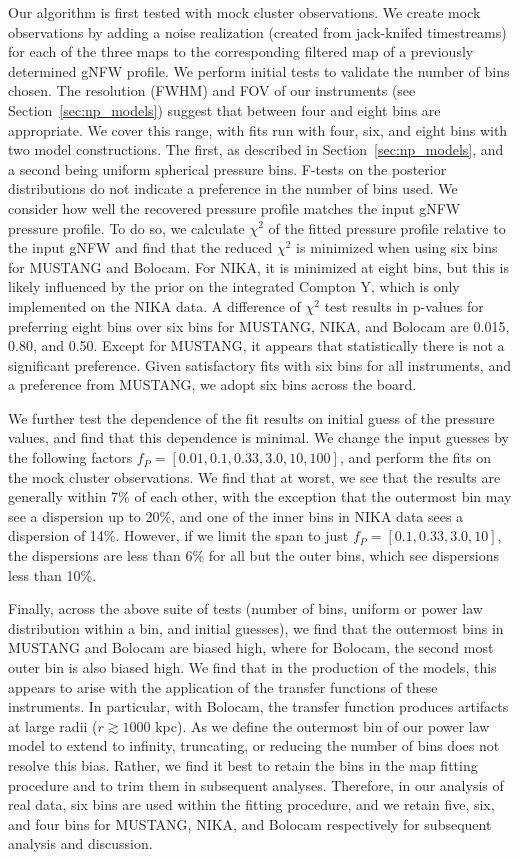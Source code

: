 \documentclass[onecolumn,traditabstract]{aa}
\begin{document}
Our algorithm is first tested with mock cluster observations. We create mock observations by adding
a noise realization (created from jack-knifed timestreams) for each of the three maps to the
corresponding filtered map of a previously determined \citep{romero2017} gNFW profile.
We perform initial tests to validate the number of bins chosen. The resolution (FWHM) and FOV of our
instruments (see Section~\ref{sec:np_models}) suggest that between four and eight bins are appropriate.
We cover this range, with fits run with four, six, and eight bins with two model constructions. The first,
as described in Section~\ref{sec:np_models}, and a second being uniform spherical pressure bins.
F-tests on the posterior distributions do not indicate a preference in the number of bins used.
We consider how well the recovered pressure profile matches the input gNFW pressure profile. To do so,
we calculate $\chi^2$ of the fitted pressure profile relative to the input gNFW and find
that the reduced $\chi^2$ is minimized when using six bins for MUSTANG and Bolocam. For NIKA, it is
minimized at eight bins, but this is likely influenced by the prior on the integrated Compton Y,
which is only implemented on the NIKA data. A difference of $\chi^2$ test results in p-values for
preferring eight bins over six bins for MUSTANG, NIKA, and Bolocam are 0.015, 0.80, and 0.50. Except for
MUSTANG, it appears that statistically there is not a significant preference. Given satisfactory
fits with six bins for all instruments, and a preference from MUSTANG, we adopt six bins across the board.

We further test the dependence of the fit results on initial guess of the pressure values, and find that this
dependence is minimal. We change the input guesses by the
following factors $f_P = [0.01,0.1,0.33,3.0,10,100]$, and perform the fits on the mock cluster observations.
We find that at worst, we see that the results are generally within 7\% of each other, with the exception
that the outermost bin may see a dispersion up to 20\%, and one of the inner bins in NIKA data sees a dispersion
of 14\%. However, if we limit the span to just $f_P = [0.1,0.33,3.0,10]$, the dispersions are less than 6\%
for all but the outer bins, which see dispersions less than 10\%.

Finally, across the above suite of tests (number of bins, uniform or power law distribution within a bin, and
initial guesses), we find that the outermost bins in MUSTANG and Bolocam are biased high, where for Bolocam,
the second most outer bin is also biased high. We find that in the production of the models, this appears to arise
with the application of the transfer functions of these instruments. In particular, with Bolocam, the transfer
function produces artifacts at large radii ($r \gtrsim 1000$ kpc). As we define the outermost bin of our power
law model to extend to infinity, truncating, or reducing the number of bins does not resolve this bias. Rather,
we find it best to retain the bins in the map fitting procedure and to trim them in subsequent analyses. Therefore,
in our analysis of real data, six bins are used within the fitting procedure, and we retain five, six, and four bins for
MUSTANG, NIKA, and Bolocam respectively for subsequent analysis and discussion.
\end{document}
